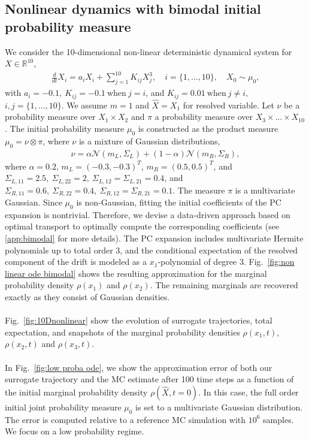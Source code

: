\documentclass[11pt, a4paper, oneside, reqno]{amsart}
\begin{document}
\subsection{Nonlinear dynamics with bimodal initial probability measure}
\noindent We consider the 10-dimensional non-linear deterministic dynamical system for $X\in\mathbb{R}^{10}$,
\begin{eqnarray}\label{eq:nonlinear dynamics}
    \frac{d}{dt}X_i = a_iX_i + \sum_{j=1}^{10}K_{ij}X_j^3,
    \quad i=\{1,\dots,10\}, \quad
    X_0 \sim \mu_0,
\end{eqnarray}
with $a_i=-0.1, \ K_{ij}=-0.1 \ \mathrm{ when }\ j=i $, and $K_{ij}=0.01 \ \mathrm{ when }\ j\neq i, \ $ $i,j=\{1,\dots,10\}$.
We assume $m=1$ and $\hat{X}=X_1$ for resolved variable. 
Let $\nu$ be a probability measure over $X_1 \times X_2$ and $\pi$ a probability measure over $X_3\times\dots\times X_{10}$.
The initial probability measure $\mu_0$ is constructed as the product measure $\mu_0=\nu \otimes \pi$, where $\nu$ is a mixture of Gaussian distributions,
\begin{eqnarray}\label{eq:bimodal measure}
    \nu = \alpha\mathcal{N}(m_{L},\Sigma_{L}) + (1-\alpha)\mathcal{N}(m_{R},\Sigma_{R}),
\end{eqnarray}
where $\alpha=0.2$, $m_L=(-0.3,-0.3)^T$, $m_R=(0.5,0.5)^T$, and $\Sigma_{L,11}=2.5, \: \Sigma_{L,22}=2,\: \Sigma_{L,12}=\Sigma_{L,21}=0.4$, and $\Sigma_{R,11}=0.6, \: \Sigma_{R,22}=0.4,\: \Sigma_{R,12}=\Sigma_{R,21}=0.1$. 
The measure $\pi$ is a multivariate Gaussian. 
Since $\mu_0$ is non-Gaussian, fitting the initial coefficients of the PC expansion is nontrivial.
Therefore, we devise a data-driven approach based on optimal transport to optimally compute the corresponding coefficients (see \ref{app:bimodal} for more details).
The PC expansion includes multivariate Hermite polynomials up to total order 3, and the conditional expectation of the resolved component of the drift is modeled as a $x_1$-polynomial of degree 3. 
Fig.~\ref{fig:non linear ode bimodal} shows the resulting approximation for the marginal probability density $\rho(x_1)$ and $\rho(x_2)$. The remaining marginals are recovered exactly as they consist of Gaussian densities.
\\ \ \\
Fig.~\ref{fig:10Dnonlinear} show the evolution of surrogate trajectories, total expectation, and snapshots of the marginal probability densities $\rho(x_1,t)$, $\rho(x_2,t)$ and $\rho(x_3,t)$. 
\\ \ \\
In Fig.~\ref{fig:low proba ode}, we show the approximation error of both
our surrogate trajectory and the MC estimate after 100 time steps as a function of the initial marginal probability density $\rho(\hat{X}, t=0)$. In this case, the full order initial joint probability measure $\mu_0$ is set to a multivariate Gaussian distribution. The error is computed relative to a reference MC simulation with $10^6$ samples. We focus on a low probability regime.    
\end{document}
